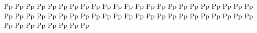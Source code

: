 \documentclass{worksheet}
\begin{document}
\begin{drillsheet}
\calligra
Pp Pp Pp Pp Pp Pp Pp Pp Pp Pp Pp Pp Pp Pp Pp Pp Pp Pp Pp Pp Pp Pp Pp Pp Pp Pp Pp Pp Pp Pp Pp Pp Pp Pp Pp Pp Pp Pp Pp Pp Pp Pp Pp Pp Pp Pp Pp Pp Pp Pp Pp Pp Pp Pp
\end{drillsheet}
\end{document}
